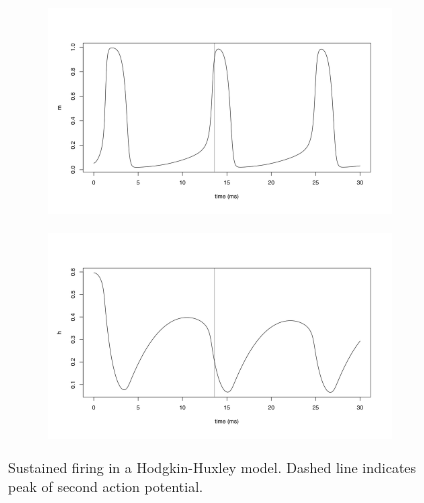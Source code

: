 \documentclass{article}
\begin{document}
\begin{figure}[h]
\begin{subfigure}[t]{0.45\linewidth}
		\label{fig:hhn}	
	\end{subfigure}%
	\hspace{0.05\linewidth}
	\begin{subfigure}[t]{0.45\linewidth}
		\centering
		\includegraphics[width = 1.0\linewidth, trim={20 20 40 70}, clip=true]{hh_m.png}
		\label{fig:hhm}	
	\end{subfigure}%
	\hspace{0.05\linewidth}
	\begin{subfigure}[t]{0.45\linewidth}
		\centering
		\includegraphics[width = 1.0\linewidth, trim={20 20 40 70}, clip=true]{hh_h.png}
		\label{fig:hhh}	
	\end{subfigure}%
\caption{Sustained firing in a Hodgkin-Huxley model. Dashed line indicates peak of second action potential.}
\label{fig:hh}
\end{figure}
\end{document}
